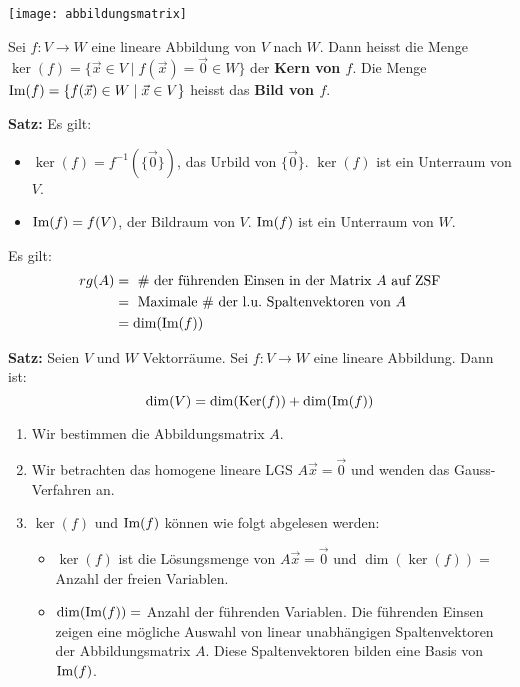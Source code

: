 \vspace{-0.5em}
\begin{center}
    \texttt{[image: abbildungsmatrix]}
\end{center}


Sei $f: V \rightarrow W$ eine lineare Abbildung von $V$ nach $W$.
Dann heisst die Menge $\ker(f) = \{ \vec{x} \in V \mid f(\vec{x}) = \vec{0} \in W \}$ der \textbf{Kern von $f$}.
Die Menge $\text{Im}(f) = \{ f(\vec{x}) \in W \mid \vec{x} \in V \}$ heisst das \textbf{Bild von $f$}.

\textbf{Satz:} Es gilt:
\begin{itemize}
    \item $\ker(f) = f^{-1}(\{ \vec{0} \})$, das Urbild von $\{ \vec{0} \}$.
    $\ker(f)$ ist ein Unterraum von $V$.
    \item $\text{Im}(f) = f(V)$, der Bildraum von $V$.
    $\text{Im}(f)$ ist ein Unterraum von $W$.
\end{itemize}

Es gilt:
\vspace{-0.8em}
\begin{align*}
    rg(A) &= \text{ \# der führenden Einsen in der Matrix $A$ auf ZSF} \\
    &= \text{ Maximale \# der l.u.\ Spaltenvektoren von $A$} \\
    &= \dim(\text{Im}(f))
\end{align*}
\vspace{-1.8em}

\textbf{Satz:} Seien $V$ und $W$ Vektorräume.
Sei $f: V \rightarrow W$ eine lineare Abbildung.
Dann ist:
\[\dim(V) = \dim(\text{Ker}(f)) + \dim(\text{Im}(f))\]

\begin{enumerate}
    \item Wir bestimmen die Abbildungsmatrix $A$.
    \item Wir betrachten das homogene lineare LGS $A \vec{x} = \vec{0}$ und wenden das Gauss-Verfahren an.
    \item $\ker(f)$ und $\text{Im}(f)$ können wie folgt abgelesen werden:
    \begin{itemize}
        \item $\ker(f)$ ist die Lösungsmenge von $A \vec{x} = \vec{0}$ und $\dim(\ker(f)) = $ Anzahl der freien Variablen.
        \item $\dim(\text{Im}(f)) = $ Anzahl der führenden Variablen.
        Die führenden Einsen zeigen eine mögliche Auswahl von linear unabhängigen Spaltenvektoren der Abbildungsmatrix $A$.
        Diese Spaltenvektoren bilden eine Basis von $\text{Im}(f)$.
    \end{itemize}
\end{enumerate}

